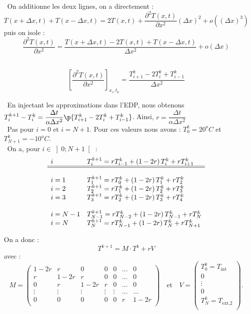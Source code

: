 \ifprof
\begin{corrige}\question\
On additionne les deux lignes, on a directement :
$$
T(x+\Delta x,t)+T(x-\Delta x,t)=2T(x,t)
+ \dfrac{\partial^2 T(x,t)}{\partial x^2}(\Delta x)^2
+o((\Delta x)^3)$$
puis on isole : 
$$
\dfrac{\partial^2 T(x,t)}{\partial x^2} 
=
\dfrac{T(x+\Delta x,t)-2T(x,t) + T(x-\Delta x,t)}{\Delta x^2 }+ o\left(\Delta x\right)
$$



\question\
$$
\left[\dfrac{\partial^2 T(x,t)}{\partial x^2}\right]_{x_i,t_k} 
=
\dfrac{T_{i+1}^k-2T_{i}^k + T_{i-1}^k}{\Delta x^2 }
$$

\question\
En injectant les approximations dans l'EDP, nous obtenons $T^{k+1}_{i}-T_i^k=\dfrac{\Delta t}{\alpha\Delta 
x^2}\p{T_{i+1}^k-2T_i^k+T_{i-1}^k}$. Ainsi,
$r=\dfrac{\Delta t}{\alpha \Delta x^2}$\\

\question\ Pas pour $i=0$ et $i=N+1$. Pour ces valeurs nous avons : $T_0^k = 20^o C$ et $T^k_{N+1}=-10^o C$. \\

\question\
On a, pour $i\in \left]0;N+1 \right[$ :
$$
\begin{array}{ll}
i & T_{i}^{k+1} = r T_{i-1}^{k} + \left( 1-2r \right) T_i^k + r T_{i+1}^k \\
\hline 
\hline 
\\
i=1 & T_{1}^{k+1} = r T_{0}^{k} + \left( 1-2r \right) T_1^k + r T_{2}^k \\
i=2 & T_{2}^{k+1} = r T_{1}^{k} + \left( 1-2r \right) T_2^k + r T_{3}^k \\
i=3 & T_{3}^{k+1} = r T_{2}^{k} + \left( 1-2r \right) T_3^k + r T_{4}^k \\
&\\
i=N -1& T_{N -1}^{k+1} = r T_{N -2}^{k} + \left( 1-2r \right) T_{N -1}^k + r T_{N}^k \\
i=N & T_{N}^{k+1} = r T_{N-1}^{k} + \left( 1-2r \right) T_N^k + r T_{N+1}^k \\
\end{array}
$$ 

On a donc : 
$$
T^{k+1} = M \cdot T^k + rV
$$
avec :
$$
M = 
\begin{pmatrix}
1-2r & r     & 0 & 0 & 0 &  \ldots & 0 \\
r     & 1-2r & r & 0 & 0  & \ldots &  0 \\
0    & r & 1-2r & r & 0   & \ldots&  0 \\
\vdots & \vdots & \vdots & \vdots & \vdots & \ldots & \ldots \\
0& 0& 0& 0& 0& r & 1-2r\\
\end{pmatrix}
\quad \text{et} \quad 
V = \begin{pmatrix}
T_0^k = T_{\text{int}} \\
0 \\
\vdots \\
0 \\
T_N^k = T_{\text{ext,2}} \\
\end{pmatrix}.
$$


\end{corrige}
